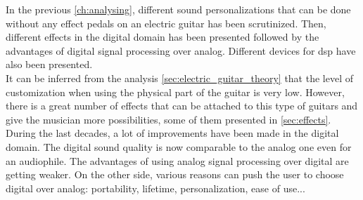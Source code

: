 In the previous \autoref{ch:analysing}, different sound personalizations that can be done without any effect pedals on an electric guitar has been scrutinized. Then, different effects in the digital domain has been presented followed by the advantages of digital signal processing over analog. Different devices for \gls{dsp} have also been presented.  \\
\newline
It can be inferred from the analysis \autoref{sec:electric_guitar_theory} that the level of customization when using the physical part of the guitar is very low. However, there is a great number of effects that can be attached to this type of guitars and give the musician more possibilities, some of them presented in \autoref{sec:effects}.  \\
During the last decades, a lot of improvements have been made in the digital domain. The digital sound quality is now comparable to the analog one even for an audiophile. The advantages of using analog signal processing over digital are getting weaker. On the other side, various reasons can push the user to choose digital over analog: portability, lifetime, personalization, ease of use...
